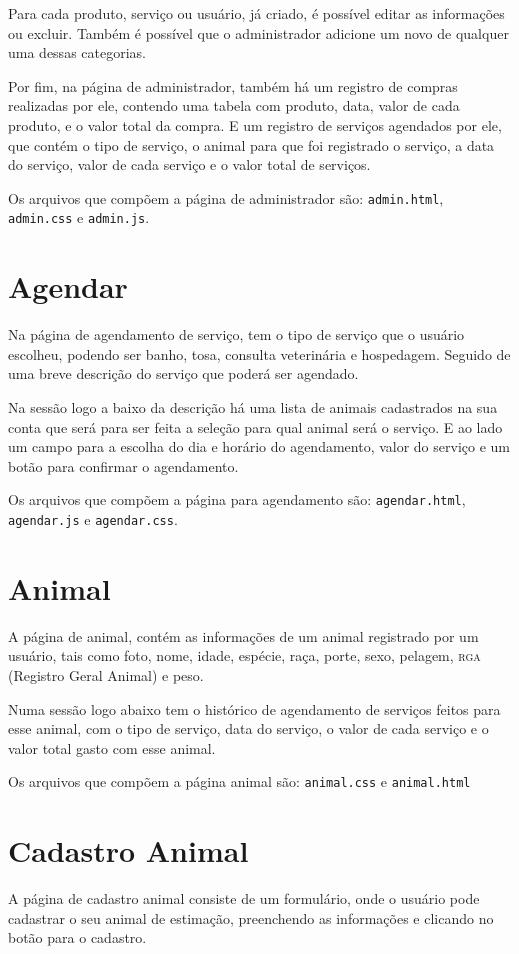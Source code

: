 Para cada produto, serviço ou usuário, já criado, é possível editar as informações
ou excluir. Também é possível que o administrador adicione um novo de qualquer uma
dessas categorias.

Por fim, na página de administrador, também há um registro de compras realizadas por
ele, contendo uma tabela com produto, data, valor de cada produto, e o valor total da
compra. E um registro de serviços agendados por ele, que contém o tipo de serviço, o
animal para que foi registrado o serviço, a data do serviço, valor de cada serviço e o
valor total de serviços.

Os arquivos que compõem a página de administrador são: \texttt{admin.html},
\texttt{admin.css} e \texttt{admin.js}.

\section{Agendar}
Na página de agendamento de serviço, tem o tipo de serviço que o usuário escolheu,
podendo ser banho, tosa, consulta veterinária e hospedagem. Seguido de uma breve descrição
do serviço que poderá ser agendado.

Na sessão logo a baixo da descrição há uma lista de animais cadastrados na sua conta
que será para ser feita a seleção para qual animal será o serviço. E ao lado um campo
para a escolha do dia e horário do agendamento, valor do serviço e um botão para confirmar
o agendamento.

Os arquivos que compõem a página para agendamento são: \texttt{agendar.html},\\
\texttt{agendar.js} e \texttt{agendar.css}.

\section{Animal}
A página de animal, contém as informações de um animal registrado por um usuário, tais como
foto, nome, idade, espécie, raça, porte, sexo, pelagem, \textsc{rga} (Registro Geral Animal)
e peso.

Numa sessão logo abaixo tem o histórico de agendamento de serviços feitos para esse animal,
com o tipo de serviço, data do serviço, o valor de cada serviço e o valor total gasto com
esse animal.

Os arquivos que compõem a página animal são: \texttt{animal.css} e \texttt{animal.html}

\section{Cadastro Animal}
A página de cadastro animal consiste de um formulário, onde o usuário pode cadastrar o seu
animal de estimação, preenchendo as informações e clicando no botão para o cadastro.

